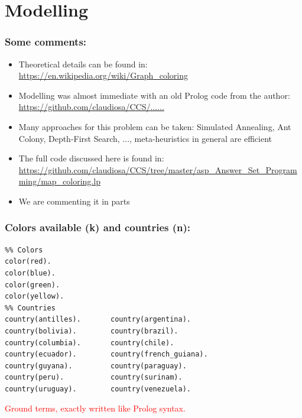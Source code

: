 \documentclass{beamer}
\begin{document}
\section{Modelling}
\begin{frame}[fragile] 
	\frametitle{Some comments:}
	
\begin{block}{}
  \begin{itemize}
 \item Theoretical details can be found in: \url{https://en.wikipedia.org/wiki/Graph_coloring}

 \item Modelling was almost immediate with an old Prolog code from the author:
\url{https://github.com/claudiosa/CCS/......}

  \item Many approaches for this problem can be taken: Simulated Annealing, Ant Colony, Depth-First Search, ..., meta-heuristics in general are efficient
  \item The full code discussed here is found in:\\ \url{https://github.com/claudiosa/CCS/tree/master/asp_Answer_Set_Programming/map_coloring.lp}
  \item We are commenting it in parts

   \end{itemize}
 \end{block}
	
	
\end{frame}
\begin{frame}[fragile] 
\frametitle{Colors available (k) and countries (n):}
	
{\small
\begin{verbatim}
%% Colors
color(red).
color(blue).
color(green).
color(yellow).
%% Countries
country(antilles).       country(argentina).
country(bolivia).        country(brazil).
country(columbia).       country(chile).
country(ecuador).        country(french_guiana).
country(guyana).         country(paraguay).
country(peru).           country(surinam).
country(uruguay).        country(venezuela).

\end{verbatim}
}	
\textcolor{red}{Ground terms, exactly written like Prolog syntax.}
\end{frame}


\end{document}
